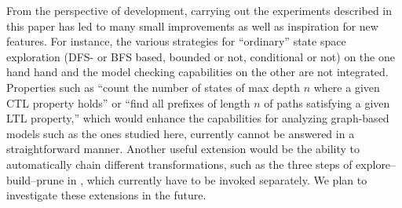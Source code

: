 \medskip\noindent From the perspective of \GROOVE development, carrying out the experiments described in this paper has led to many small improvements as well as inspiration for new features. For instance, the various strategies for ``ordinary'' state space exploration (DFS- or BFS based, bounded or not, conditional or not) on the one hand hand and the model checking capabilities on the other are not integrated. Properties such as ``count the number of states of max depth $n$ where a given CTL property holds'' or ``find all prefixes of length $n$ of paths satisfying a given LTL property,'' which would enhance the capabilities for analyzing graph-based models such as the ones studied here, currently cannot be answered in a straightforward manner. Another useful extension would be the ability to automatically chain different transformations, such as the three steps of explore--build--prune in , which currently have to be invoked separately. We plan to investigate these extensions in the future.
